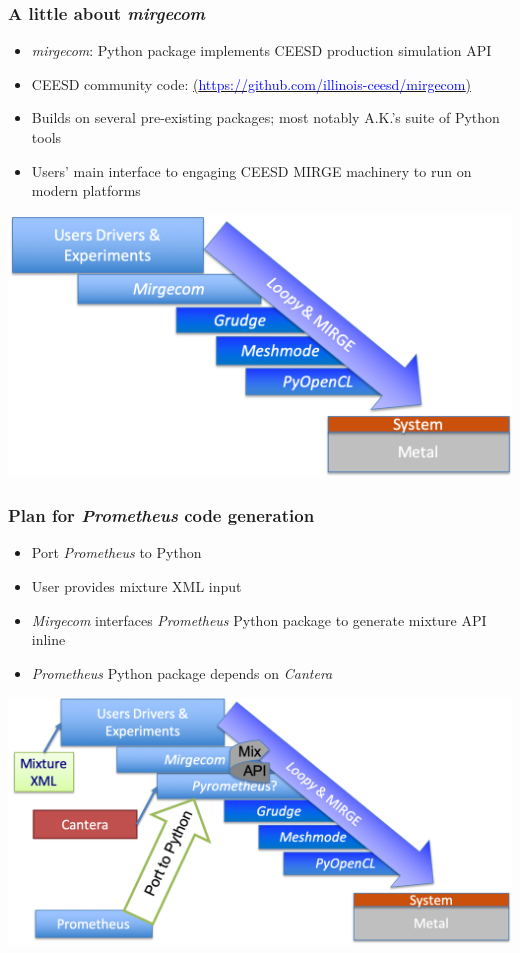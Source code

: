 \begin{frame}\frametitle{A little about \textit{mirgecom}}
\begin{multicols}{2}
\begin{itemize}
  \item \textit{mirgecom}: Python package implements CEESD production simulation API
  \item CEESD community code: \href{https://github.com/illinois-ceesd/mirgecom}{(\textcolor{blue}{https://github.com/illinois-ceesd/mirgecom})}
  \item Builds on several pre-existing packages; most notably A.K.'s suite of Python tools
  \item Users' main interface to engaging CEESD MIRGE machinery to run on modern platforms
\end{itemize}
\end{multicols}
\begin{center}
\includegraphics[width=.7\textwidth]{figures/mirgecom_cartoon.png}
\end{center}
\end{frame}

\begin{frame}\frametitle{Plan for \textit{Prometheus} code generation}
\begin{multicols}{2}
\begin{itemize}
  \item Port \textit{Prometheus} to Python
  \item User provides mixture XML input
  \item \textit{Mirgecom} interfaces \textit{Prometheus} Python package to generate mixture API inline
  \item \textit{Prometheus} Python package depends on \textit{Cantera}
\end{itemize}
\end{multicols}
\begin{center}
\includegraphics[width=.8\textwidth]{figures/ultimate_integration.png}
\end{center}
\end{frame}

